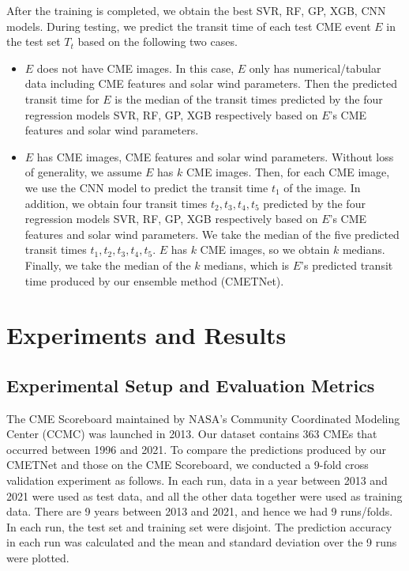 \documentclass{article}
\begin{document}
After the training is completed, we obtain the best
SVR, RF, GP, XGB, CNN models. 
During testing, we predict the transit time of each test CME event $E$
in the test set $T_{t}$ based on the following two cases.
\begin{itemize}
    \item $E$ does not have CME images. In this case, $E$ only has numerical/tabular data including CME features and solar wind parameters. Then the predicted transit time for $E$ is the median of the transit times predicted by the four 
    regression models SVR, RF, GP, XGB respectively based on $E$'s CME features and solar wind parameters.
    \item $E$ has CME images, CME features and solar wind parameters.
    Without loss of generality, we assume $E$ has $k$ CME images.
    Then, for each CME image, we use the CNN model to predict the transit time $t_{1}$
    of the image. In addition, we obtain four transit times 
    $t_{2}, t_{3}, t_{4}, t_{5}$
    predicted by
    the four regression models SVR, RF, GP, XGB respectively 
    based on $E$'s CME features and solar wind parameters.
    We take the median of the five predicted transit times
    $t_{1}, t_{2}, t_{3}, t_{4}, t_{5}$.
    $E$ has $k$ CME images, so we obtain $k$ medians.
    Finally, we take the median of the $k$ medians, which 
    is $E$'s predicted transit time produced by our ensemble method (CMETNet).
\end{itemize}

\section{Experiments and Results}
\label{sec:expresults}

\subsection{Experimental Setup and Evaluation Metrics}

The CME Scoreboard maintained by NASA's Community Coordinated Modeling Center (CCMC) 
was launched in 2013.
Our dataset contains 363 CMEs that occurred between 1996 and 2021.
To compare the predictions produced by our CMETNet and those on the CME Scoreboard,
we conducted a 9-fold cross validation experiment as follows.
In each run, data in a year between 2013 and 2021 were used as test data, and all the other data together
were used as training data.
There are 9 years between 2013 and 2021, and hence we had 9 runs/folds.
In each run, the test set and training set were disjoint.
The prediction accuracy in each run was calculated 
and the mean and standard deviation over the 9 runs were plotted.
\end{document}
